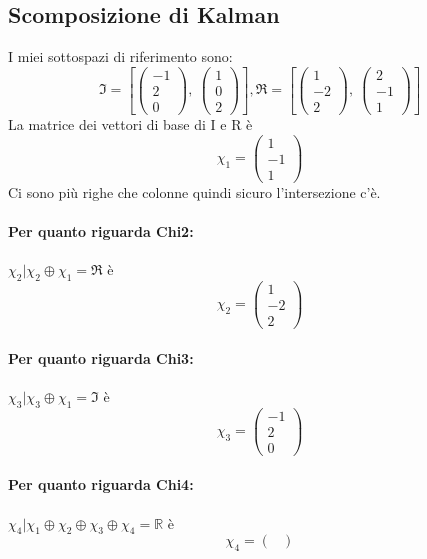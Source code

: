 \documentclass{article}
\begin{document}
\subsection{Scomposizione di Kalman}
I miei sottospazi di riferimento sono:	\[ \mathfrak{I} = \left[ \left(\begin{matrix}-1\\2\\0\end{matrix}\right), \  \left(\begin{matrix}1\\0\\2\end{matrix}\right)\right], \mathfrak{R} = \left[ \left(\begin{matrix}1\\-2\\2\end{matrix}\right), \  \left(\begin{matrix}2\\-1\\1\end{matrix}\right)\right] \]
La matrice dei vettori di base di I e R è \[ \chi_1 =  \left(\begin{matrix}1\\-1\\1\end{matrix}\right) \]
Ci sono più righe che colonne quindi sicuro l'intersezione c'è.

\paragraph{Per quanto riguarda Chi2:} $ \chi_2 | \chi_2 \oplus \chi_1 = \mathfrak{R} $ è \[ \chi_2 = \left(\begin{matrix}1\\-2\\2\end{matrix}\right) \]

\paragraph{Per quanto riguarda Chi3:} $ \chi_3 | \chi_3 \oplus \chi_1 = \mathfrak{I} $ è \[ \chi_3 = \left(\begin{matrix}-1\\2\\0\end{matrix}\right) \]

\paragraph{Per quanto riguarda Chi4:} $ \chi_4 | \chi_1 \oplus \chi_2 \oplus  \chi_3 \oplus \chi_4 = \mathbb{R} $ è \[ \chi_4 = \left(\begin{matrix}\end{matrix}\right) \]
\end{document}
